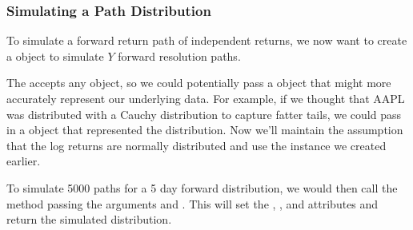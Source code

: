 \documentclass[letterpaper,10pt,english]{sphinxmanual}
\begin{document}
\subsubsection{Simulating a Path Distribution}
\label{\detokenize{gettingstarted:simulating-a-path-distribution}}
\sphinxAtStartPar
To simulate a forward return path of independent returns, we now want to
create a  object to simulate \(Y\) forward
resolution paths.

\begin{sphinxVerbatim}[commandchars=\\\{\}]
  
\end{sphinxVerbatim}

\sphinxAtStartPar
The  accepts any  object, so we could
potentially pass a  object that might more accurately
represent our underlying data. For example, if we thought that AAPL was
distributed with a Cauchy distribution to capture fatter tails, we could
pass in a  object that represented the distribution. Now
we’ll maintain the assumption that the log returns are normally
distributed and use the  instance we created earlier.

\sphinxAtStartPar
To simulate 5000 paths for a 5 day forward distribution, we would then
call the  method passing the arguments 
and . This will set the
, , and 
attributes and return the simulated distribution.

\begin{sphinxVerbatim}[commandchars=\\\{\}]
   
\end{sphinxVerbatim}
\end{document}

